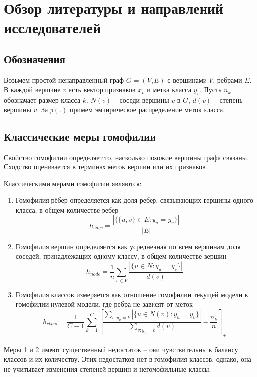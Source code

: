 \documentclass[a4paper,14pt]{article}
\begin{document}
	\pagebreak
    \section{Обзор литературы и направлений исследователей}
    \setcounter{figure}{0}
    
    \subsection{Обозначения}
    
    Возьмем простой ненаправленный граф $G = (V,E)$ с вершинами $V$, ребрами $E$.
    В каждой вершине $v$ есть вектор признаков $x_v$ и метка класса $y_v$.
    Пусть $n_k$ обозначает размер класса $k$. $N(v)$ – соседи вершины $v$ в $G$, $d(v)$ – степень вершины $v$.
    За $p(.)$ примем эмпирическое распределение меток класса.
    
    \subsection{Классические меры гомофилии}
    
    Свойство гомофилии определяет то, насколько похожие вершины графа связаны. Сходство оценивается в терминах меток вершин или  их признаков.
    
    Классическими мерами гомофилии являются:

	\begin{enumerate}
		\item Гомофилия рёбер определяется как доля ребер, связывающих вершины одного класса, в общем количестве ребер 
		$$h_{edge} = \dfrac{|\{\{u,v\} \in E : y_u = y_v\}|}{|E|}$$
		
		\item Гомофилия вершин определяется как усредненная по всем вершинам доля соседей, принадлежащих одному классу, в общем количестве вершин
		$$h_{node} = \dfrac{1}{n}\sum_{v \in V}\dfrac{|\{u \in N : y_u = y_v\}|}{d(v)}$$
		
		\item Гомофилия классов измеряется как отношение гомофилии текущей модели к гомофилии нулевой модели, где ребра не зависят от меток
		$$h_{class} = \dfrac{1}{C-1}\sum_{k=1}^{C}\left[ \dfrac{\sum_{v:y_v=k}|\{u \in N(v): y_u = y_v\}|}{\sum_{v:y_v=k}d(v)} - \dfrac{n_k}{n}\right]_+$$
	\end{enumerate}
	
	Меры 1 и 2 имеют существенный недостаток – они чувствительны к балансу классов и их количеству.
	Этих недостатков нет в гомофилия классов, однако, она не учитывает изменения степеней вершин и негомофильные классы. 
	
\end{document}
